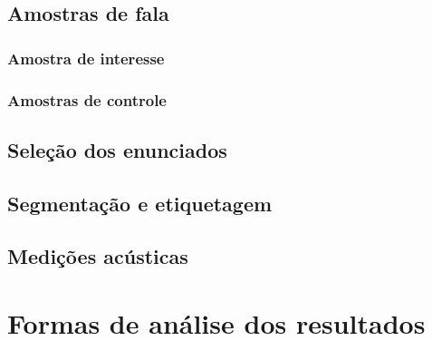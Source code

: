 \documentclass[
			a4paper,		%
			12pt,			%
			]{article}		%
\begin{document}
	\subsection{Amostras de fala} \label{amostra}
	
		\subsubsection{Amostra de interesse} \label{amostra-int}
		
		\subsubsection{Amostras de controle} \label{amostra-ctrl}

	\subsection{Seleção dos enunciados} \label{selecao}

	\subsection{Segmentação e etiquetagem} \label{segm}

	\subsection{Medições acústicas} \label{medicoes}
	
\section{Formas de análise dos resultados} \label{analise}

{ %
	\printbibliography
}
\end{document}
